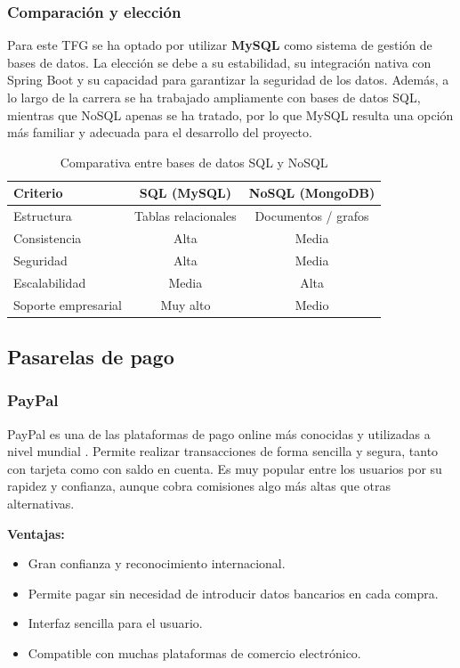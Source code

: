 \subsubsection{Comparación y elección}
Para este TFG se ha optado por utilizar \textbf{MySQL} como sistema de gestión de bases de datos. La elección se debe a su estabilidad, su integración nativa con Spring Boot y su capacidad para garantizar la seguridad de los datos. Además, a lo largo de la carrera se ha trabajado ampliamente con bases de datos SQL, mientras que NoSQL apenas se ha tratado, por lo que MySQL resulta una opción más familiar y adecuada para el desarrollo del proyecto.

\begin{table}[H]
\centering
\begin{tabular}{|l|c|c|}
\hline
\textbf{Criterio} & \textbf{SQL (MySQL)} & \textbf{NoSQL (MongoDB)} \\ \hline
Estructura & Tablas relacionales & Documentos / grafos \\ \hline
Consistencia & Alta & Media \\ \hline
Seguridad & Alta & Media \\ \hline
Escalabilidad & Media & Alta \\ \hline
Soporte empresarial & Muy alto & Medio \\ \hline
\end{tabular}
\caption{Comparativa entre bases de datos SQL y NoSQL}
\end{table}

\subsection{Pasarelas de pago}

\subsubsection{PayPal}
PayPal es una de las plataformas de pago online más conocidas y utilizadas a nivel mundial \cite{paypalDocs}. Permite realizar transacciones de forma sencilla y segura, tanto con tarjeta como con saldo en cuenta. Es muy popular entre los usuarios por su rapidez y confianza, aunque cobra comisiones algo más altas que otras alternativas.

\textbf{Ventajas:}
\begin{itemize}
    \item Gran confianza y reconocimiento internacional.
    \item Permite pagar sin necesidad de introducir datos bancarios en cada compra.
    \item Interfaz sencilla para el usuario.
    \item Compatible con muchas plataformas de comercio electrónico.
\end{itemize}


